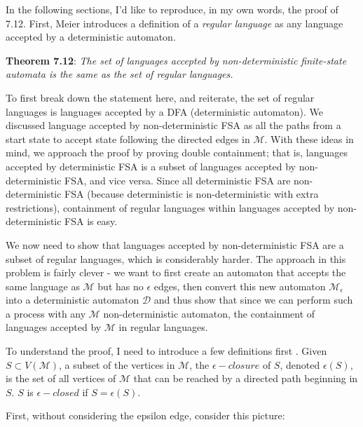 \documentclass[12pt]{amsart}
\begin{document}
In the following sections, I'd like to reproduce, in my own words, the proof of 7.12. First, Meier introduces a definition of a \emph{regular language} as any language accepted by a deterministic automaton. 

\textbf{Theorem 7.12}: \emph{The set of languages accepted by non-deterministic finite-state automata is the same as the set of regular languages.} \cite{ggt}

To first break down the statement here, and reiterate, the set of regular languages is languages accepted by a DFA (deterministic automaton). We discussed language accepted by non-deterministic FSA as all the paths from a start state to accept state following the directed edges in $\mathcal{M}$. With these ideas in mind, we approach the proof by proving double containment; that is, languages accepted by deterministic FSA is a subset of languages accepted by non-deterministic FSA, and vice versa. Since all deterministic FSA are non-deterministic FSA (because deterministic is non-deterministic with extra restrictions), containment of regular languages within languages accepted by non-deterministic FSA is easy. 

We now need to show that languages accepted by non-deterministic FSA are a subset of regular languages, which is considerably harder. The approach in this problem is fairly clever - we want to first create an automaton that accepts the same language as $\mathcal{M}$ but has no $\epsilon$ edges, then convert this new automaton $\mathcal{M}_\epsilon$ into a deterministic automaton $\mathcal{D}$ and thus show that since we can perform such a process with any $\mathcal{M}$ non-deterministic automaton, the containment of languages accepted by $\mathcal{M}$ in regular languages.

To understand the proof, I need to introduce a few definitions first \cite{ggt}. Given $S\subset V(\mathcal{M})$, a subset of the vertices in $\mathcal{M}$, the $\epsilon-closure$ of $S$, denoted $\epsilon(S)$, is the set of all vertices of $\mathcal{M}$ that can be reached by a directed path beginning in $S$. $S$ is $\epsilon-closed$ if $S=\epsilon(S)$\cite{ggt}. 

First, without considering the epsilon edge, consider this picture:

\begin{center}
\end{center}
\end{document}
